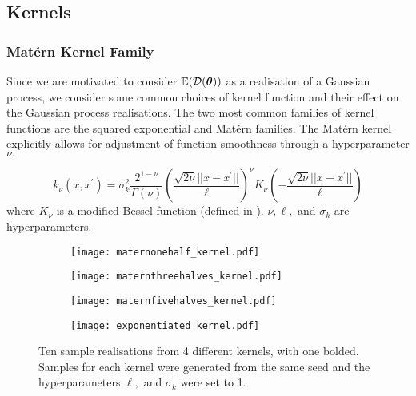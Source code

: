 \subsection*{Kernels}

\subsubsection*{Mat\'{e}rn Kernel Family}

Since we are motivated to consider $\operatorname{\mathbb{E}}(\mathcal{D}(\bm{\theta}))$ as a realisation of a
Gaussian process, we consider some common choices of kernel function and their
effect on the Gaussian process realisations. The two most common families of
kernel functions are the squared exponential
and Mat\'ern families.
The Mat\'ern kernel explicitly allows for adjustment of function
smoothness through a hyperparameter $\nu.$

\begin{definition}
    $$k_\nu(x, x^\prime)
        = \sigma^2_k \frac{2^{1 - \nu}}{\Gamma(\nu)}
        \left(\frac{\sqrt{2\nu}||x - x^\prime||}{\ell}\right)^\nu
        K_\nu\left(-\frac{\sqrt{2\nu}||x - x^\prime||}{\ell}\right)$$
    where $K_\nu$ is a modified Bessel function
    (defined in \cite[374]{abramowitz_handbook_2013}). $\nu, \ell,$ and
    $\sigma_k$ are hyperparameters.
\end{definition}

\begin{figure}[htbp]
    \centering
    \begin{subfigure}[b]{0.5\textwidth}
        \centering
        \texttt{[image: maternonehalf\_kernel.pdf]}
        \label{fig:mat_one_half}
    \end{subfigure}%
    \hfill%
    \begin{subfigure}[b]{0.5\textwidth}
        \centering
        \texttt{[image: maternthreehalves\_kernel.pdf]}
        \label{fig:mat_three_halves}
    \end{subfigure}
    \begin{subfigure}[b]{0.5\textwidth}
        \centering
        \texttt{[image: maternfivehalves\_kernel.pdf]}
        \label{fig:mat_five_halves}
    \end{subfigure}%
    \hfill%
    \begin{subfigure}[b]{0.5\textwidth}
        \centering
        \texttt{[image: exponentiated\_kernel.pdf]}
        \label{fig:squared_exp}
    \end{subfigure}%
    \caption{
        Ten sample realisations from 4 different kernels, with one bolded.
        Samples
        for each kernel were generated from the same seed and the
        hyperparameters $\ell,$ and $\sigma_k$ were set to 1.
    }
    \label{fig:kernels}
\end{figure}

